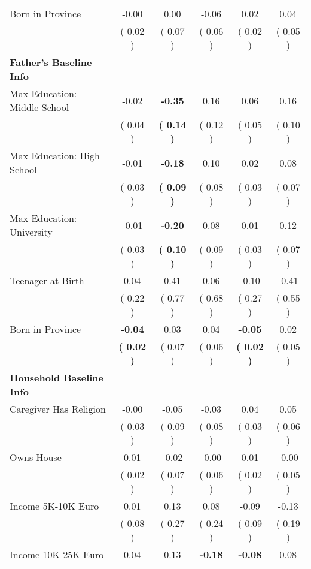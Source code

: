 \begin{table}[H]
{\begin{tabular}{lccccc}
\quad Born in Province &     -0.00 &      0.00 &     -0.06 &      0.02 &      0.04 \\
\quad  & (     0.02 ) & (     0.07 )  & (     0.06 )  & (     0.02 ) & (     0.05 ) \\
\midrule
\textbf{Father's Baseline Info} \\
\quad Max Education: Middle School &     -0.02 & \textbf{    -0.35} &      0.16 &      0.06 &      0.16 \\
\quad  & (     0.04 ) & \textbf{(     0.14 )}  & (     0.12 )  & (     0.05 ) & (     0.10 ) \\
\quad Max Education: High School &     -0.01 & \textbf{    -0.18} &      0.10 &      0.02 &      0.08 \\
\quad  & (     0.03 ) & \textbf{(     0.09 )}  & (     0.08 )  & (     0.03 ) & (     0.07 ) \\
\quad Max Education: University &     -0.01 & \textbf{    -0.20} &      0.08 &      0.01 &      0.12 \\
\quad  & (     0.03 ) & \textbf{(     0.10 )}  & (     0.09 )  & (     0.03 ) & (     0.07 ) \\
\quad Teenager at Birth &      0.04 &      0.41 &      0.06 &     -0.10 &     -0.41 \\
\quad  & (     0.22 ) & (     0.77 )  & (     0.68 )  & (     0.27 ) & (     0.55 ) \\
\quad Born in Province & \textbf{    -0.04} &      0.03 &      0.04 & \textbf{    -0.05} &      0.02 \\
\quad  & \textbf{(     0.02 )} & (     0.07 )  & (     0.06 )  & \textbf{(     0.02 )} & (     0.05 ) \\
\midrule
\textbf{Household Baseline Info} \\
\quad Caregiver Has Religion &     -0.00 &     -0.05 &     -0.03 &      0.04 &      0.05 \\
\quad  & (     0.03 ) & (     0.09 )  & (     0.08 )  & (     0.03 ) & (     0.06 ) \\
\quad Owns House &      0.01 &     -0.02 &     -0.00 &      0.01 &     -0.00 \\
\quad  & (     0.02 ) & (     0.07 )  & (     0.06 )  & (     0.02 ) & (     0.05 ) \\
\quad Income 5K-10K Euro &      0.01 &      0.13 &      0.08 &     -0.09 &     -0.13 \\
\quad  & (     0.08 ) & (     0.27 )  & (     0.24 )  & (     0.09 ) & (     0.19 ) \\
\quad Income 10K-25K Euro &      0.04 &      0.13 & \textbf{    -0.18} & \textbf{    -0.08} &      0.08 \\

\end{tabular}}
\end{table}
